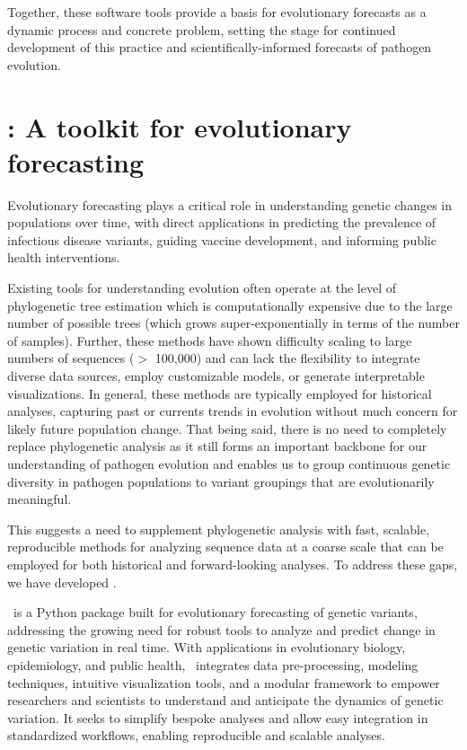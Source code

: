 Together, these software tools provide a basis for evolutionary forecasts as a dynamic process and concrete problem, setting the stage for continued development of this practice and scientifically-informed forecasts of pathogen evolution.

\section{\evofr: A toolkit for evolutionary forecasting}

Evolutionary forecasting plays a critical role in understanding genetic changes in populations over time, with direct applications in predicting the prevalence of infectious disease variants, guiding vaccine development, and informing public health interventions.

Existing tools for understanding evolution often operate at the level of phylogenetic tree estimation which is computationally expensive due to the large number of possible trees (which grows super-exponentially in terms of the number of samples).
Further, these methods have shown difficulty scaling to large numbers of sequences ($>$ 100,000) and can lack the flexibility to integrate diverse data sources, employ customizable models, or generate interpretable visualizations. %
In general, these methods are typically employed for historical analyses, capturing past or currents trends in evolution without much concern for likely future population change.
That being said, there is no need to completely replace phylogenetic analysis as it still forms an important backbone for our understanding of pathogen evolution and enables us to group continuous genetic diversity in pathogen populations to variant groupings that are evolutionarily meaningful.

This suggests a need to supplement phylogenetic analysis with fast, scalable, reproducible methods for analyzing sequence data at a coarse scale that can be employed for both historical and forward-looking analyses.
To address these gaps, we have developed \evofr.

\evofr\ is a Python package built for evolutionary forecasting of genetic variants, addressing the growing need for robust tools to analyze and predict change in genetic variation in real time.
With applications in evolutionary biology, epidemiology, and public health, \evofr\ integrates data pre-processing, modeling techniques, intuitive visualization tools, and a modular framework to empower researchers and scientists to understand and anticipate the dynamics of genetic variation.
It seeks to simplify bespoke analyses and allow easy integration in standardized workflows, enabling reproducible and scalable analyses.

